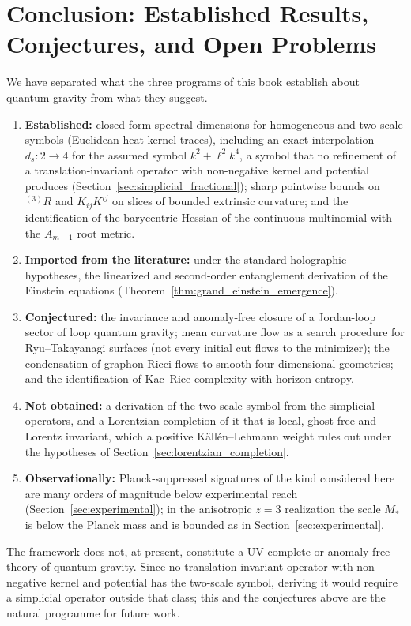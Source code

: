 \documentclass[11pt,a4paper,reqno]{amsart}
\theoremstyle{definition}
\numberwithin{equation}{section}
\begin{document}
\section{Conclusion: Established Results, Conjectures, and Open Problems}
\label{sec:conclusion}

We have separated what the three programs of this book establish about quantum gravity from what they suggest.
\begin{enumerate}
    \item \textbf{Established:} closed-form spectral dimensions for homogeneous and two-scale symbols (Euclidean heat-kernel traces), including an exact interpolation $d_s: 2 \to 4$ for the assumed symbol $k^2 + \ell^2 k^4$, a symbol that no refinement of a translation-invariant operator with non-negative kernel and potential produces (Section~\ref{sec:simplicial_fractional}); sharp pointwise bounds on ${}^{(3)}R$ and $K_{ij}K^{ij}$ on slices of bounded extrinsic curvature; and the identification of the barycentric Hessian of the continuous multinomial with the $A_{m-1}$ root metric.
    \item \textbf{Imported from the literature:} under the standard holographic hypotheses, the linearized and second-order entanglement derivation of the Einstein equations (Theorem~\ref{thm:grand_einstein_emergence}).
    \item \textbf{Conjectured:} the invariance and anomaly-free closure of a Jordan-loop sector of loop quantum gravity; mean curvature flow as a search procedure for Ryu--Takayanagi surfaces (not every initial cut flows to the minimizer); the condensation of graphon Ricci flows to smooth four-dimensional geometries; and the identification of Kac--Rice complexity with horizon entropy.
    \item \textbf{Not obtained:} a derivation of the two-scale symbol from the simplicial operators, and a Lorentzian completion of it that is local, ghost-free and Lorentz invariant, which a positive K\"all\'en--Lehmann weight rules out under the hypotheses of Section~\ref{sec:lorentzian_completion}.
    \item \textbf{Observationally:} Planck-suppressed signatures of the kind considered here are many orders of magnitude below experimental reach (Section~\ref{sec:experimental}); in the anisotropic $z = 3$ realization the scale $M_\ast$ is below the Planck mass and is bounded as in Section~\ref{sec:experimental}.
\end{enumerate}
The framework does not, at present, constitute a UV-complete or anomaly-free theory of quantum gravity. Since no translation-invariant operator with non-negative kernel and potential has the two-scale symbol, deriving it would require a simplicial operator outside that class; this and the conjectures above are the natural programme for future work.
\end{document}
